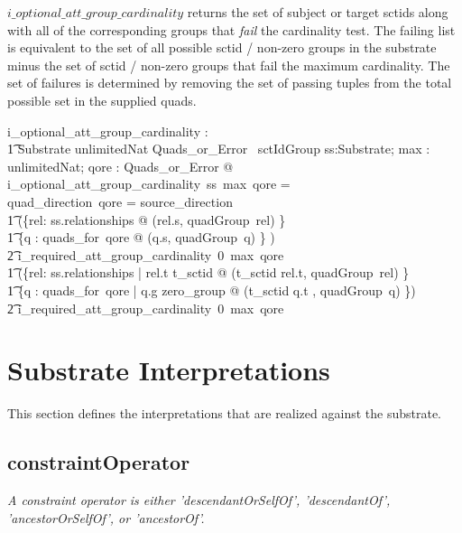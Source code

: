 \documentclass{article}
\def\desc#1{{\small \textsl{{#1}} }}
\begin{document}
\noindent
$i\_optional\_att\_group\_cardinality$ returns the set of subject or target sctids along with all of the corresponding groups that \emph{fail} the cardinality test.  The failing list
is equivalent to the set of all possible sctid / non-zero groups in the substrate minus the set of sctid / non-zero groups that fail the maximum cardinality. The set of failures is determined by removing the set of passing tuples from the total possible set in the supplied quads.
\begin{axdef}
   i\_optional\_att\_group\_cardinality : \\
\t1 Substrate \fun unlimitedNat \fun Quads\_or\_Error \ \fun \power sctIdGroup
\where
   \forall ss:Substrate; max : unlimitedNat; qore : Quads\_or\_Error  @ \\
i\_optional\_att\_group\_cardinality~ss~max~qore = \\
\IF quad\_direction~qore = source\_direction \THEN \\
\t1  (\{rel: ss.relationships @ (rel.s, quadGroup~rel) \}~  \setminus \\
\t1 \{q : quads\_for~qore @ (q.s, quadGroup~q) \} )~ ~  \cup \\
\t2 i\_required\_att\_group\_cardinality~0~max~qore
\also
\ELSE \\
\t1  (\{rel: ss.relationships | rel.t \in \ran t\_sctid @ (t\_sctid \inv rel.t, quadGroup~rel) \}~  \setminus \\
\t1 \{q : quads\_for~qore | q.g \neq zero\_group @ (t\_sctid \inv q.t , quadGroup~q) \})~ ~  \cup \\
\t2 i\_required\_att\_group\_cardinality~0~max~qore
\end{axdef}



\section{Substrate Interpretations}
\label{sect:substrate}
This section defines the interpretations that are realized against the substrate. 

\subsection{constraintOperator}
\begin{framed}
\desc{A constraint operator is either 'descendantOrSelfOf', 'descendantOf', 'ancestorOrSelfOf', or 'ancestorOf'.}
\end{framed}
\end{document}
